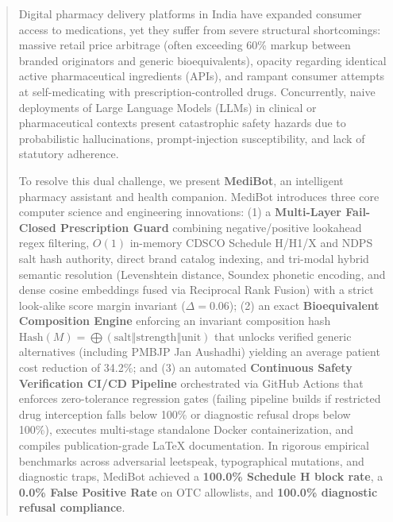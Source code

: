 \documentclass[11pt,a4paper]{article}
\begin{document}
\begin{abstract}
\noindent
Digital pharmacy delivery platforms in India have expanded consumer access to medications, yet they suffer from severe structural shortcomings: massive retail price arbitrage (often exceeding 60\% markup between branded originators and generic bioequivalents), opacity regarding identical active pharmaceutical ingredients (APIs), and rampant consumer attempts at self-medicating with prescription-controlled drugs. Concurrently, naive deployments of Large Language Models (LLMs) in clinical or pharmaceutical contexts present catastrophic safety hazards due to probabilistic hallucinations, prompt-injection susceptibility, and lack of statutory adherence.

To resolve this dual challenge, we present \textbf{MediBot}, an intelligent pharmacy assistant and health companion. MediBot introduces three core computer science and engineering innovations: (1) a \textbf{Multi-Layer Fail-Closed Prescription Guard} combining negative/positive lookahead regex filtering, $O(1)$ in-memory CDSCO Schedule H/H1/X and NDPS salt hash authority, direct brand catalog indexing, and tri-modal hybrid semantic resolution (Levenshtein distance, Soundex phonetic encoding, and dense cosine embeddings fused via Reciprocal Rank Fusion) with a strict look-alike score margin invariant ($\Delta = 0.06$); (2) an exact \textbf{Bioequivalent Composition Engine} enforcing an invariant composition hash $\text{Hash}(M) = \bigoplus (\text{salt} \mathbin{\Vert} \text{strength} \mathbin{\Vert} \text{unit})$ that unlocks verified generic alternatives (including PMBJP Jan Aushadhi) yielding an average patient cost reduction of 34.2\%; and (3) an automated \textbf{Continuous Safety Verification CI/CD Pipeline} orchestrated via GitHub Actions that enforces zero-tolerance regression gates (failing pipeline builds if restricted drug interception falls below 100\% or diagnostic refusal drops below 100\%), executes multi-stage standalone Docker containerization, and compiles publication-grade LaTeX documentation. In rigorous empirical benchmarks across adversarial leetspeak, typographical mutations, and diagnostic traps, MediBot achieved a \textbf{100.0\% Schedule H block rate}, a \textbf{0.0\% False Positive Rate} on OTC allowlists, and \textbf{100.0\% diagnostic refusal compliance}.
\end{abstract}
\end{document}

